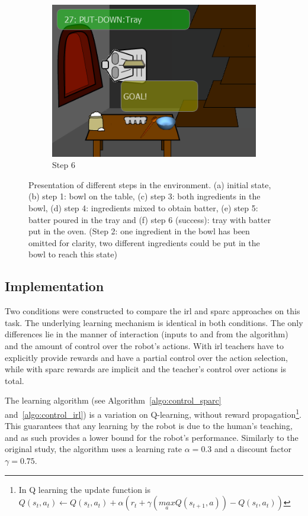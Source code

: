 \begin{figure}[ht]
\begin{subfigure}[b]{0.325\textwidth}
		\includegraphics[width=\textwidth]{step6.png}
		\caption{Step 6}
		\label{fig:control_goal}
	\end{subfigure}
	
	\caption{Presentation of different steps in the environment. (a) initial state, (b) step 1: bowl on the table, (c) step 3: both ingredients in the bowl, (d) step 4: ingredients mixed to obtain batter, (e) step 5: batter poured in the tray and (f) step 6 (success): tray with batter put in the oven. (Step 2: one ingredient in the bowl has been omitted for clarity, two different ingredients could be put in the bowl to reach this state)}
	\label{fig:control_states}
\end{figure}

\subsection{Implementation}

Two conditions were constructed to compare the \gls{irl} and \gls{sparc} approaches on this task. The underlying learning mechanism is identical in both conditions. The only differences lie in the manner of interaction (inputs to and from the algorithm) and the amount of control over the robot's actions. With \gls{irl} teachers have to explicitly provide rewards and have a partial control over the action selection, while with \gls{sparc} rewards are implicit and the teacher's control over actions is total. 

The learning algorithm (see Algorithm~\ref{algo:control_sparc} and~\ref{algo:control_irl}) is a variation on Q-learning, without reward propagation\footnote{In Q learning the update function is $Q(s_{t},a_{t}) \leftarrow Q(s_{t},a_{t}) + \alpha (r_{t}+\gamma (\underset{a}{max} Q(s_{t+1},a))-Q(s_{t},a_{t}))$}. This guarantees that any learning by the robot is due to the human's teaching, and as such provides a lower bound for the robot's performance. 
Similarly to the original study, the algorithm uses a learning rate $\alpha = 0.3$ and a discount factor $\gamma = 0.75$.

